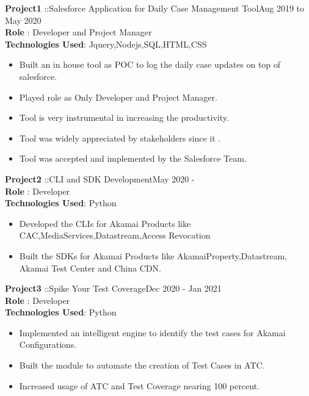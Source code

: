 \documentclass{resumeclass}
\begin{document}
\begin{resume}
  
  \textbf{Project1} ::Salesforce Application for Daily Case Management Tool\hfill      Aug 2019 to May 2020 \\
  \textbf{Role} : Developer and Project Manager\\
  \textbf{Technologies Used}: Jquery,Nodejs,SQL,HTML,CSS
  
   \begin{itemize} \itemsep -2pt
    \item Built an in house tool as POC to log the daily case updates on top of salesforce. 
    \item Played role as Only Developer and Project Manager. 
    \item Tool is very instrumental in increasing the productivity.
    \item Tool was widely appreciated by stakeholders since it .
    \item Tool was accepted and implemented by the Salesforce Team.
  \end{itemize} \vspace{-6pt}

  \textbf{Project2} ::CLI and SDK Development\hfill      May 2020 - \\
  \textbf{Role} : Developer \\
  \textbf{Technologies Used}: Python
  
   \begin{itemize} \itemsep -2pt
    \item Developed the CLIs for Akamai Products like CAC,MediaServices,Datastream,Access Revocation
    \item Built the SDKs for Akamai Products like AkamaiProperty,Datastream, Akamai Test Center and China CDN.
  \end{itemize} \vspace{-6pt}

  \textbf{Project3} ::Spike Your Test Coverage\hfill      Dec 2020 - Jan 2021\\
  \textbf{Role} : Developer \\
  \textbf{Technologies Used}: Python
  
   \begin{itemize} \itemsep -2pt
    \item Implemented an intelligent engine to identify the test cases for Akamai Configurations.
    \item Built the module to automate the creation of Test Cases in ATC.
    \item Increased usage of ATC and Test Coverage nearing 100 percent.
  \end{itemize} \vspace{-6pt}


\end{resume}
\end{document}
